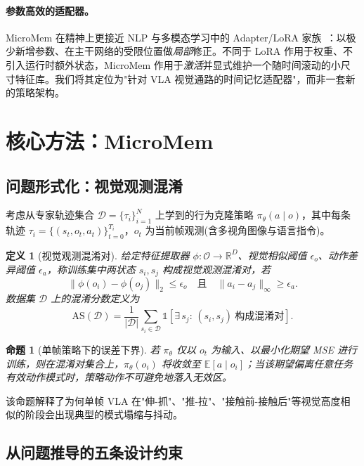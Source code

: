 \documentclass[11pt]{ctexart}
\newtheorem{definition}{定义}
\newtheorem{proposition}{命题}
\begin{document}
\paragraph{参数高效的适配器。}
MicroMem 在精神上更接近 NLP 与多模态学习中的 Adapter/LoRA 家族~\cite{houlsby2019adapter,hu2022lora}：以极少新增参数、在主干网络的受限位置做\emph{局部}修正。不同于 LoRA 作用于权重、不引入运行时额外状态，MicroMem 作用于\emph{激活}并显式维护一个随时间滚动的小尺寸特征库。我们将其定位为"针对 VLA 视觉通路的时间记忆适配器"，而非一套新的策略架构。

\section{核心方法：MicroMem}
\label{sec:method}

\subsection{问题形式化：视觉观测混淆}

考虑从专家轨迹集合 $\mathcal{D} = \{\tau_i\}_{i=1}^{N}$ 上学到的行为克隆策略 $\pi_\theta(a \mid o)$，其中每条轨迹 $\tau_i = \{(s_t, o_t, a_t)\}_{t=0}^{T_i}$，$o_t$ 为当前帧观测(含多视角图像与语言指令)。

\begin{definition}[视觉观测混淆对]
\label{def:alias}
给定特征提取器 $\phi:\mathcal{O} \to \mathbb{R}^D$、视觉相似阈值 $\epsilon_o$、动作差异阈值 $\epsilon_a$，称训练集中两状态 $s_i,s_j$ 构成\emph{视觉观测混淆对}，若
\[
\|\phi(o_i) - \phi(o_j)\|_2 \le \epsilon_o \quad \text{且} \quad \|a_i - a_j\|_{\infty} \ge \epsilon_a .
\]
数据集 $\mathcal{D}$ 上的\emph{混淆分数}定义为
\[
\mathrm{AS}(\mathcal{D}) = \frac{1}{|\mathcal{D}|} \sum_{s_i \in \mathcal{D}} \mathbb{1}\!\left[\exists\, s_j:\, (s_i,s_j)\ \text{构成混淆对} \right].
\]
\end{definition}

\begin{proposition}[单帧策略下的误差下界]
若 $\pi_\theta$ 仅以 $o_t$ 为输入、以最小化期望 MSE 进行训练，则在混淆对集合上，$\pi_\theta(o_i)$ 将收敛至 $\mathbb{E}[a \mid o_i]$；当该期望偏离任意任务有效动作模式时，策略动作不可避免地落入无效区。
\end{proposition}

该命题解释了为何单帧 VLA 在"伸-抓"、"推-拉"、"接触前-接触后"等视觉高度相似的阶段会出现典型的模式塌缩与抖动。

\subsection{从问题推导的五条设计约束}
\label{subsec:principles}
\end{document}
